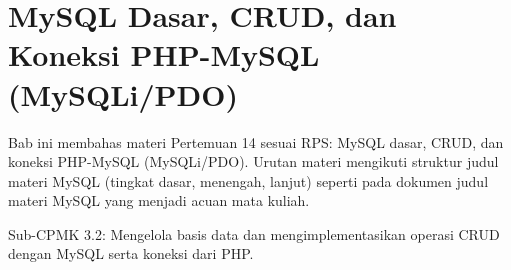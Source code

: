\documentclass[../main.tex]{subfiles}
\begin{document}
\chapter{MySQL Dasar, CRUD, dan Koneksi PHP-MySQL (MySQLi/PDO)}

Bab ini membahas materi Pertemuan 14 sesuai RPS: MySQL dasar, CRUD, dan koneksi PHP-MySQL (MySQLi/PDO). Urutan materi mengikuti struktur judul materi MySQL (tingkat dasar, menengah, lanjut) seperti pada dokumen judul materi MySQL yang menjadi acuan mata kuliah.

\begin{subcpmk}
  \item Sub-CPMK 3.2: Mengelola basis data dan mengimplementasikan operasi CRUD dengan MySQL serta koneksi dari PHP.
\end{subcpmk}















































\end{document}
